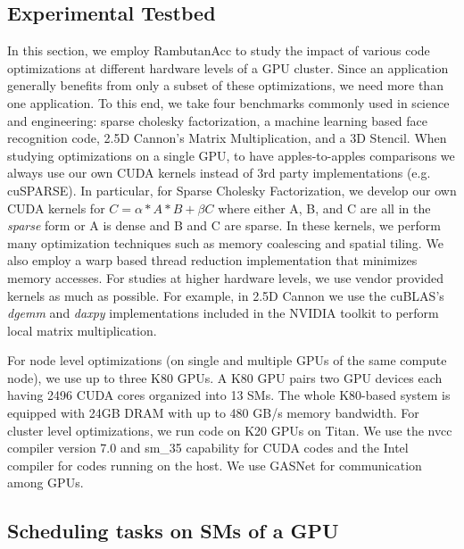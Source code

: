 \subsection{Experimental Testbed}
In this section, we employ RambutanAcc to study the impact of various code optimizations at different hardware levels of a GPU cluster.
Since an application generally benefits from only a subset of these optimizations, we need more than one application.
To this end, we take four benchmarks commonly used in science and engineering: sparse cholesky factorization, a machine learning based face recognition code, 2.5D Cannon's Matrix Multiplication, and a 3D Stencil.
When studying optimizations on a single GPU, to have apples-to-apples comparisons we always use our own CUDA kernels instead of 3rd party implementations (e.g. cuSPARSE). 
In particular, for Sparse Cholesky Factorization, we develop our own CUDA kernels for $C = \alpha* A * B + \beta C$ where either A, B, and C are all in the {\em sparse} form or A is dense and B and C are sparse.
In these kernels, we perform many optimization techniques such as memory coalescing and spatial tiling.
We also employ a warp based thread reduction implementation that minimizes memory accesses. 
For studies at higher hardware levels, we use vendor provided kernels as much as possible.
For example, in  2.5D Cannon we use the cuBLAS's {\em dgemm} and {\em daxpy} implementations included in the NVIDIA toolkit to perform local matrix multiplication.

For node level optimizations (on single and multiple GPUs of the same compute node), we use up to three K80 GPUs.
A K80 GPU pairs two GPU devices each having 2496 CUDA cores organized into 13 SMs.
The whole K80-based system is equipped with 24GB DRAM with up to 480 GB/s memory bandwidth.
For cluster level optimizations, we run code on K20 GPUs on Titan.
We use the nvcc compiler version 7.0 and sm\_35 capability for CUDA codes and the Intel compiler for codes running on the host.
We use GASNet for communication among GPUs. 


\subsection{Scheduling tasks on SMs of a GPU}


